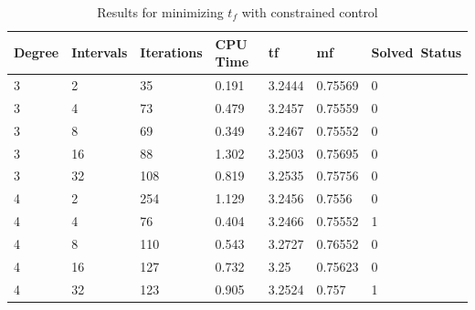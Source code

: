 \documentclass[]{article}
\begin{document}
\begin{table}
	\begin{tabular}{lllllll}
		Degree & Intervals & Iterations & CPU Time & tf & mf & Solved\ Status \\ 
		\hline 
		3 & 2 & 35 & 0.191 & 3.2444 & 0.75569 & 0 \\ 
		3 & 4 & 73 & 0.479 & 3.2457 & 0.75559 & 0 \\ 
		3 & 8 & 69 & 0.349 & 3.2467 & 0.75552 & 0 \\ 
		3 & 16 & 88 & 1.302 & 3.2503 & 0.75695 & 0 \\ 
		3 & 32 & 108 & 0.819 & 3.2535 & 0.75756 & 0 \\ 
		4 & 2 & 254 & 1.129 & 3.2456 & 0.7556 & 0 \\ 
		4 & 4 & 76 & 0.404 & 3.2466 & 0.75552 & 1 \\ 
		4 & 8 & 110 & 0.543 & 3.2727 & 0.76552 & 0 \\ 
		4 & 16 & 127 & 0.732 & 3.25 & 0.75623 & 0 \\ 
		4 & 32 & 123 & 0.905 & 3.2524 & 0.757 & 1 \\ 
		\hline 
	\end{tabular}
	\caption{Results for minimizing \(t_f\) with constrained control}
	\label{table:3}
\end{table}
\FloatBarrier
\end{document}
